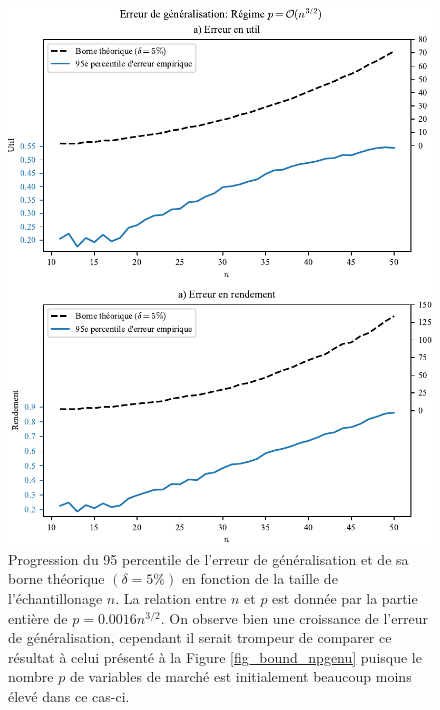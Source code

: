 \begin{figure}[h!]
  \centering
  \includegraphics[width=\textwidth]{../experiments/fig/bound_np_np32.pdf}
  \caption[Erreur de généralisation -- Régime $p=\bigO(n^{3/2})$]{Progression du 95\ieme
    percentile de l'erreur de généralisation et de sa borne théorique $(\delta = 5\%)$ en
    fonction de la taille de l'échantillonage $n$. La relation entre $n$ et $p$ est donnée
    par la partie entière de $p = 0.0016n^{3/2}$. On observe bien une croissance de
    l'erreur de généralisation, cependant il serait trompeur de comparer ce résultat à
    celui présenté à la Figure \ref{fig_bound_npgenu} puisque le nombre $p$ de variables
    de marché est initialement beaucoup moins élevé dans ce cas-ci.}
  \label{fig_np_np32}
\end{figure}


